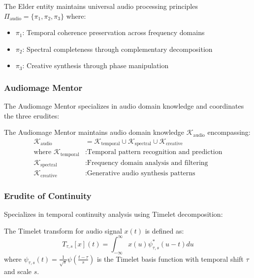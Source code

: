 \begin{definition}
The Elder entity maintains universal audio processing principles $\Pi_{\text{audio}} = \{\pi_1, \pi_2, \pi_3\}$ where:
\begin{itemize}
    \item $\pi_1$: Temporal coherence preservation across frequency domains
    \item $\pi_2$: Spectral completeness through complementary decomposition
    \item $\pi_3$: Creative synthesis through phase manipulation
\end{itemize}
\end{definition}

\subsubsection{Audiomage Mentor}
The Audiomage Mentor specializes in audio domain knowledge and coordinates the three erudites:

\begin{definition}
The Audiomage Mentor maintains audio domain knowledge $\mathcal{K}_{\text{audio}}$ encompassing:
\begin{align}
\mathcal{K}_{\text{audio}} &= \mathcal{K}_{\text{temporal}} \cup \mathcal{K}_{\text{spectral}} \cup \mathcal{K}_{\text{creative}} \\
\text{where } \mathcal{K}_{\text{temporal}} &: \text{Temporal pattern recognition and prediction} \\
\mathcal{K}_{\text{spectral}} &: \text{Frequency domain analysis and filtering} \\
\mathcal{K}_{\text{creative}} &: \text{Generative audio synthesis patterns}
\end{align}
\end{definition}

\subsubsection{Erudite of Continuity}
Specializes in temporal continuity analysis using Timelet decomposition:

\begin{definition}
The Timelet transform for audio signal $x(t)$ is defined as:
\begin{equation}
T_{\tau,s}[x](t) = \int_{-\infty}^{\infty} x(u) \psi_{\tau,s}^*(u-t) du
\end{equation}
where $\psi_{\tau,s}(t) = \frac{1}{\sqrt{s}} \psi\left(\frac{t-\tau}{s}\right)$ is the Timelet basis function with temporal shift $\tau$ and scale $s$.
\end{definition}

